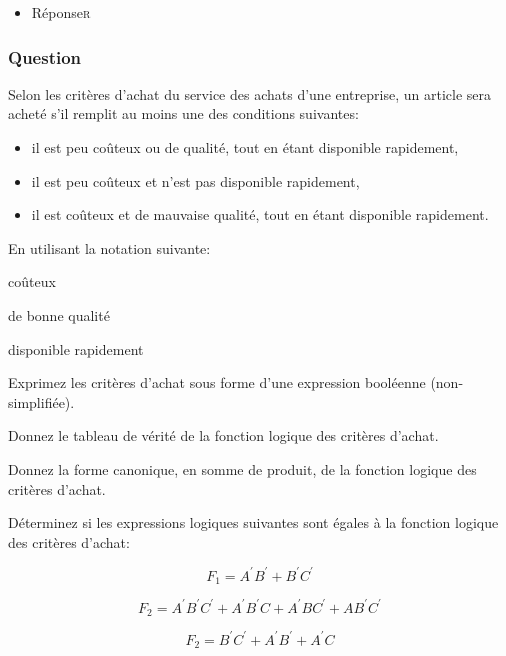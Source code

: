 \documentclass[11pt]{article}
\begin{document}
\begin{itemize}
\item Réponse\hfill{}\textsc{r}
\label{sec:org229c382}
\end{itemize}

\subsubsection*{Question}
\label{sec:org7f0f4dd}
Selon les critères d'achat du service des achats d'une entreprise, un
  article sera acheté s'il remplit au moins une des conditions
  suivantes:

\begin{itemize}
\item il est peu coûteux ou de qualité, tout en étant disponible
rapidement,

\item il est peu coûteux et n'est pas disponible rapidement,

\item il est coûteux et de mauvaise qualité, tout en étant disponible
rapidement.
\end{itemize}

En utilisant la notation suivante:

\begin{description}
\item[{A}] coûteux

\item[{B}] de bonne qualité

\item[{C}] disponible rapidement

\item Exprimez les critères d'achat sous forme d'une expression
booléenne (non-simplifiée).

\item Donnez le tableau de vérité de la fonction logique des critères
d'achat.

\item Donnez la forme canonique, en somme de produit, de la fonction
logique des critères d'achat.

\item Déterminez si les expressions logiques suivantes sont égales à la
fonction logique des critères d'achat:

$$F_1 = A^{\prime} B^{\prime} + B^{\prime} C^{\prime}$$

$$F_2 = A^{\prime} B^{\prime} C^{\prime} + A^{\prime} B^{\prime} C + A^{\prime} B C^{\prime} + A B^{\prime} C^{\prime}$$

$$F_2 = B^{\prime} C^{\prime} + A^{\prime} B^{\prime} + A^{\prime} C$$
\end{description}
\end{document}
